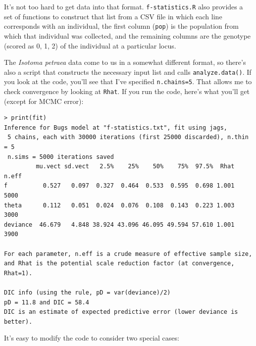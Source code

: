 \documentclass[12pt]{article}
\begin{document}
It's not too hard to get data into that format. {\tt f-statistics.R}
also provides a set of functions to construct that list from a CSV
file in which each line corresponds with an individual, the first
column ({\tt pop}) is the population from which that individual was
collected, and the remaining columns are the genotype (scored as 0, 1,
2) of the individual at a particular locus.

The {\it Isotoma petraea\/} data come to us in a somewhat different
format, so there's also a script that constructs the necessary input
list and calls {\tt analyze.data()}. If you look at the code, you'll
see that I've specified {\tt n.chains=5}. That allows me to check
convergence by looking at {\tt Rhat}. If you run the code, here's what
you'll get (except for MCMC error):
\begin{verbatim}
> print(fit)
Inference for Bugs model at "f-statistics.txt", fit using jags,
 5 chains, each with 30000 iterations (first 25000 discarded), n.thin = 5
 n.sims = 5000 iterations saved
         mu.vect sd.vect   2.5%    25%    50%    75%  97.5%  Rhat n.eff
f          0.527   0.097  0.327  0.464  0.533  0.595  0.698 1.001  5000
theta      0.112   0.051  0.024  0.076  0.108  0.143  0.223 1.003  3000
deviance  46.679   4.848 38.924 43.096 46.095 49.594 57.610 1.001  3900

For each parameter, n.eff is a crude measure of effective sample size,
and Rhat is the potential scale reduction factor (at convergence, Rhat=1).

DIC info (using the rule, pD = var(deviance)/2)
pD = 11.8 and DIC = 58.4
DIC is an estimate of expected predictive error (lower deviance is better).
\end{verbatim}

It's easy to modify the code to consider two special cases:
\end{document}
